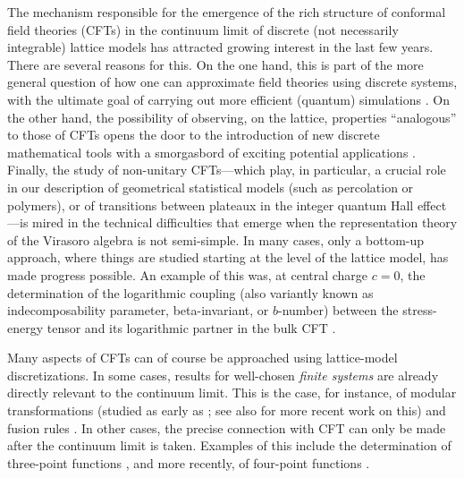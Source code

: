 \documentclass[a4paper,10pt]{article}
\begin{document}
The mechanism responsible for the emergence of the rich  structure of conformal field theories (CFTs)  in the continuum limit of discrete (not necessarily integrable)  lattice models has attracted growing interest in the last few years. There are several  reasons for this. On the one hand, this is part of the more general question of how one can approximate  field theories using discrete systems, with the ultimate goal of carrying out more efficient (quantum) simulations \cite{Vidal,Vidal2,Verstraete}. On the other hand, the possibility of observing, on the lattice, properties ``analogous'' to those of  CFTs opens the door to the introduction of new discrete mathematical tools with a smorgasbord of exciting potential applications \cite{Smirnov,V.Jones}. Finally, the study of non-unitary CFTs---which play, in particular, a crucial role in our description of geometrical statistical models (such as percolation or polymers),  or of transitions between plateaux in the integer quantum Hall effect---is mired in the technical difficulties that emerge when the representation theory of the Virasoro algebra is not semi-simple. In many cases, only a bottom-up approach, where things are studied starting at the level of the lattice model, has made progress possible. An example of this was, at central charge $c=0$, the determination of the logarithmic coupling (also variantly known as indecomposability parameter, beta-invariant, or $b$-number) between the stress-energy tensor and its logarithmic partner in the bulk CFT \cite{GurarieLudwig,DJS,VJS,VGJS}. 

Many  aspects  of CFTs can of course be approached  using lattice-model discretizations. In some cases, results for  well-chosen {\sl finite systems} are already directly relevant to the continuum limit. This is the case, for instance, of modular transformations (studied as early as \cite{PasquierSaleur}; see also \cite{Fendley} for more recent work on this)  and  fusion rules \cite{ReadSaleur07-2,GJS18}.  In other cases, the precise connection with CFT can only be made after the continuum limit is taken. Examples of this include the determination of three-point functions \cite{IkhlefJacobsenSaleur,Vidal3}, and more recently, of  four-point functions \cite{Ribault,JacobsenSaleur,HeGransJacobsenSaleur,HeJacobsenSaleur}. 
\end{document}

